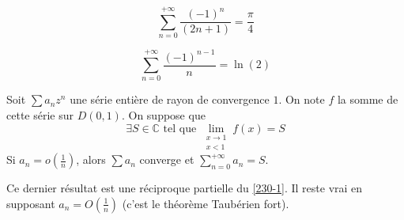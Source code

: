 	\begin{application}
		\[ \sum_{n=0}^{+\infty} \frac{(-1)^n}{(2n+1)} = \frac{\pi}{4} \]
	\end{application}
	
	\begin{application}
		\[ \sum_{n=0}^{+\infty} \frac{(-1)^{n-1}}{n} = \ln(2) \]
	\end{application}
	
	\begin{theorem}
		Soit $\sum a_n z^n$ une série entière de rayon de convergence $1$. On note $f$ la somme de cette série sur $D(0,1)$. On suppose que
		\[ \exists S \in \mathbb{C} \text{ tel que } \lim_{\substack{x \rightarrow 1 \\ x < 1}} f(x) = S \]
		Si $a_n = o \left( \frac{1}{n} \right)$, alors $\sum a_n$ converge et $\sum_{n=0}^{+\infty} a_n = S$.
	\end{theorem}
	
	\begin{remark}
		Ce dernier résultat est une réciproque partielle du \cref{230-1}. Il reste vrai en supposant $a_n = O \left( \frac{1}{n} \right)$ (c'est le théorème Taubérien fort).
	\end{remark}
